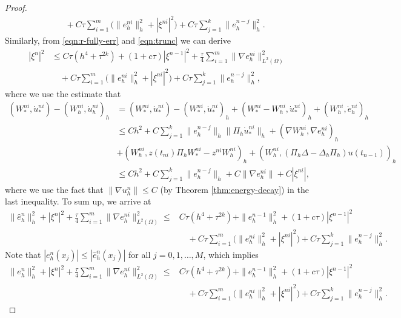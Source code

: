 \documentclass[10pt,final,leqno,onefignum,onetabnum]{siamltex}%
\def\II{(\Omega)}
\begin{document}
\begin{proof}
\begin{equation}
\begin{split}
&\quad + C \tau   \sum_{i=1}^m \Big(\|  e_h^{ni} \|_h^2+ |\xi^{ni}|^2 \Big)
+ C\tau  \sum_{j=1}^{k} \|  e_h^{n-j} \|_h^2.
\end{split}
\end{equation}
Similarly, from \eqref{eqn:r-fully-err} and \eqref{eqn:trunc} we can derive
\begin{equation*}
\begin{split}
|\xi^n|^2 &\le C\tau(h^4+ \tau^{2k}) + (1+c \tau) |\xi^{n-1}|^2 + \frac \tau4 \sum_{i=1}^m \| \nabla e_h^{ni} \|_{L^2\II}^2 \\
&\quad + C \tau   \sum_{i=1}^m \Big(\|  e_h^{ni} \|_h^2+ |\xi^{ni}|^2 \Big)
+ C\tau  \sum_{j=1}^{k} \|  e_h^{n-j} \|_h^2,
\end{split}
\end{equation*}
where we use the estimate that
\begin{align*}
  (W_*^{ni} ,   \dot u_*^{ni}) -  (W_h^{ni} ,   \dot u_h^{ni})_h &=  (W_*^{ni} ,   \dot u_*^{ni})  -  (W_*^{ni} ,   \dot u_*^{ni}) _h
   + (W_*^{ni}-W_h^{ni},  \dot u_*^{ni})_h + (W_h^{ni},  \dot e_h^{ni} )_h \\
  & \le C h^{2} + C\sum_{j=1}^k \|  e_h^{n-j} \|_h \|  \Pi_h \dot u_*^{ni} \|_h + (\nabla W_h^{ni},  \nabla  e_h^{ni} )_h\\
 &+ ( W_h^{ni}, z(t_{ni}) \Pi_h W_*^{ni} - z^{ni} W_h^{ni} )_h
  +  ( W_h^{ni}, (\Pi_h \Delta - \Delta_h \Pi_h) u(t_{n-1}) )_h \\
 & \le C h^{2} + C\sum_{j=1}^k \|  e_h^{n-j} \|_h + C \| \nabla  e_h^{ni} \|  + C|\xi^{ni}|,
\end{align*}
where we use the fact that $ \| \nabla u_h^{n} \|\le C$ (by Theorem \ref{thm:energy-decay}) in the last inequality. To sum up, we arrive at
\begin{equation*}
\begin{split}
 \|\hat e_h^{n}\|_h^2 + |\xi^n|^2 + \frac\tau4 \sum_{i=1}^m \| \nabla e_h^{ni} \|_{L^2\II}^2
 \le&  C\tau(h^4+ \tau^{2k}) +  \|e_h^{n-1}\|_h^2 + (1+c \tau) |\xi^{n-1}|^2   \\
&\quad + C \tau   \sum_{i=1}^m \Big(\|  e_h^{ni} \|_h^2+ |\xi^{ni}|^2 \Big)
+ C\tau  \sum_{j=1}^{k} \|  e_h^{n-j} \|_h^2.
\end{split}
\end{equation*}
Note that $| e_h^{n}(x_j)| \le |\hat e_h^{n}(x_j)|$ for all $j=0,1,\ldots,M$, which implies
\begin{equation}\label{eqn:sav-est-02}
\begin{split}
 \|e_h^{n}\|_h^2 + |\xi^n|^2 + \frac\tau4 \sum_{i=1}^m \| \nabla e_h^{ni} \|_{L^2\II}^2
 \le&  C\tau(h^4+ \tau^{2k}) +  \|e_h^{n-1}\|_h^2 + (1+c \tau) |\xi^{n-1}|^2   \\
&\quad + C \tau   \sum_{i=1}^m \Big(\|  e_h^{ni} \|_h^2+ |\xi^{ni}|^2 \Big)
+ C\tau  \sum_{j=1}^{k} \|  e_h^{n-j} \|_h^2.
\end{split}
\end{equation}


\end{proof}
\end{document}
